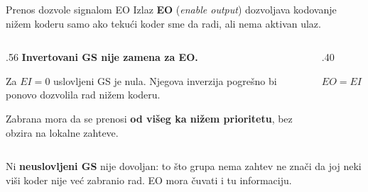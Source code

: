 \begin{frame}[t,label=03-s020b]{Prenos dozvole signalom EO}
\setlength{\parskip}{0pt}
Izlaz \textcolor{DEisticanje}{\textbf{EO}} (\emph{enable output})
dozvoljava kodovanje nižem koderu samo ako tekući koder sme da radi,
ali nema aktivan ulaz.
\par\vspace{2mm}
\begin{columns}[c,onlytextwidth]
\begin{column}{.56\textwidth}
\textcolor{DEisticanje}{\textbf{Invertovani GS nije zamena za EO.}}
\par\vspace{1.5mm}
Za \(EI=0\) uslovljeni GS je nula. Njegova inverzija pogrešno bi
ponovo dozvolila rad nižem koderu.
\par\vspace{1.5mm}
Zabrana mora da se prenosi \textbf{od višeg ka nižem prioritetu},
bez obzira na lokalne zahteve.
\end{column}
\begin{column}{.40\textwidth}\centering

\par\vspace{1mm}
\(EO=EI\cdot\overline{GS}\)
\end{column}
\end{columns}
\par\vspace{2mm}
Ni \textbf{neuslovljeni GS} nije dovoljan: to što grupa nema zahtev ne znači
da joj neki viši koder nije već zabranio rad. EO mora čuvati i tu informaciju.
\end{frame}
